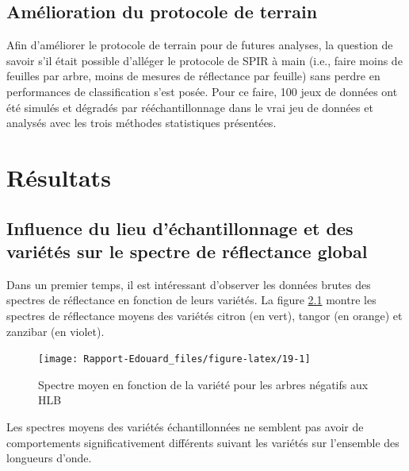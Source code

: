\documentclass[
  11pt,
  french,
  a4paper,
  extrafontsizes,onecolumn,openright
  ]{memoir}
\begin{document}
\hypertarget{amuxe9lioration-du-protocole-de-terrain}{%
\section{Amélioration du protocole de terrain}\label{amuxe9lioration-du-protocole-de-terrain}}

Afin d'améliorer le protocole de terrain pour de futures analyses, la question de savoir s'il était possible d'alléger le protocole de SPIR à main (i.e., faire moins de feuilles par arbre, moins de mesures de réflectance par feuille) sans perdre en performances de classification s'est posée. Pour ce faire, 100 jeux de données ont été simulés et dégradés par rééchantillonnage dans le vrai jeu de données et analysés avec les trois méthodes statistiques présentées.

\hypertarget{ruxe9sultats}{%
\chapter{Résultats}\label{ruxe9sultats}}

\hypertarget{influence-du-lieu-duxe9chantillonnage-et-des-variuxe9tuxe9s-sur-le-spectre-de-ruxe9flectance-global}{%
\section{Influence du lieu d'échantillonnage et des variétés sur le spectre de réflectance global}\label{influence-du-lieu-duxe9chantillonnage-et-des-variuxe9tuxe9s-sur-le-spectre-de-ruxe9flectance-global}}

Dans un premier temps, il est intéressant d'observer les données brutes des spectres de réflectance en fonction de leurs variétés.
La figure \ref{fig:19} montre les spectres de réflectance moyens des variétés citron (en vert), tangor (en orange) et zanzibar (en violet).

\scriptsize

\begin{figure}

{\centering \texttt{[image: Rapport-Edouard\_files/figure-latex/19-1]} 

}

\caption{Spectre moyen en fonction de la variété pour les arbres négatifs aux HLB}\label{fig:19}
\end{figure}

\normalsize

Les spectres moyens des variétés échantillonnées ne semblent pas avoir de comportements significativement différents suivant les variétés sur l'ensemble des longueurs d'onde.
\end{document}
